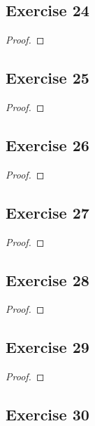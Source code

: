 \documentclass[14pt]{extarticle}
\begin{document}
\subsection{Exercise 24}

\begin{proof}

\end{proof}

\subsection{Exercise 25}

\begin{proof}

\end{proof}

\subsection{Exercise 26}

\begin{proof}

\end{proof}

\subsection{Exercise 27}

\begin{proof}

\end{proof}

\subsection{Exercise 28}

\begin{proof}

\end{proof}

\subsection{Exercise 29}

\begin{proof}

\end{proof}

\subsection{Exercise 30}
\end{document}
